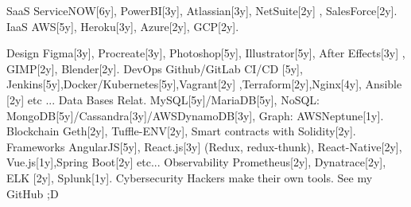\vspace{5mm}

\begin{cvskills}
\cvskill
{SaaS} %
{ ServiceNOW[6y], PowerBI[3y], Atlassian[3y], NetSuite[2y] , SalesForce[2y]. } %
\cvskill
{IaaS} %
{ AWS[5y], Heroku[3y], Azure[2y], GCP[2y]. } %

\cvskill
{Design} %
{Figma[3y], Procreate[3y], Photoshop[5y], Illustrator[5y], After Effects[3y] , GIMP[2y], Blender[2y].} %
\cvskill
{DevOps} %
{Github/GitLab CI/CD [5y], Jenkins[5y],Docker/Kubernetes[5y],Vagrant[2y] ,Terraform[2y],Nginx[4y], Ansible [2y] etc ...} %
\cvskill
{Data Bases} %
{Relat. MySQL[5y]/MariaDB[5y], NoSQL: MongoDB[5y]/Cassandra[3y]/AWSDynamoDB[3y], Graph: AWSNeptune[1y].} %
\cvskill
{Blockchain} %
{ Geth[2y], Tuffle-ENV[2y], Smart contracts with Solidity[2y].} %
\cvskill
{Frameworks} %
{ AngularJS[5y], React.js[3y] (Redux, redux-thunk), React-Native[2y], Vue.js[1y],Spring Boot[2y] etc...}
\cvskill
{Observability} %
{Prometheus[2y], Dynatrace[2y], ELK [2y], Splunk[1y]. } %
\cvskill
{Cybersecurity} %
{Hackers make their own tools. See my GitHub ;D} %


\end{cvskills}
